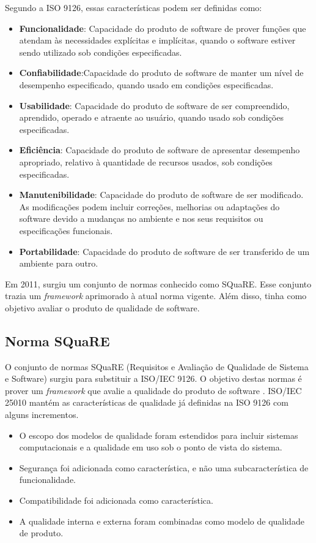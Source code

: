 Segundo a ISO 9126, essas características podem ser definidas como:
\begin{itemize}
\item \textbf{Funcionalidade}: Capacidade do produto de software de prover funções que atendam às necessidades explícitas e implícitas, quando o software estiver sendo utilizado sob condições especificadas.
\item \textbf{Confiabilidade}:Capacidade do produto de software de manter um nível de desempenho especificado, quando usado em condições especificadas.
\item \textbf{Usabilidade}: Capacidade do produto de software de ser compreendido, aprendido, operado e atraente ao usuário, quando usado sob condições especificadas.
\item \textbf{Eficiência}: Capacidade do produto de software de apresentar desempenho apropriado, relativo à quantidade de recursos usados, sob condições especificadas.
\item \textbf{Manutenibilidade}: Capacidade do produto de software de ser modificado. As modificações podem incluir correções, melhorias ou adaptações do software devido a mudanças no ambiente e nos seus requisitos ou especificações funcionais.
\item \textbf{Portabilidade}: Capacidade do produto de software de ser transferido de um ambiente para outro.
\end{itemize}

Em 2011, surgiu um conjunto de normas conhecido como SQuaRE. Esse conjunto trazia um \textit{framework} aprimorado à atual norma vigente. Além disso, tinha como objetivo avaliar o produto de qualidade de software.

\subsection{Norma SQuaRE}
O conjunto de normas SQuaRE (Requisitos e Avaliação de Qualidade de Sistema e Software) surgiu para substituir a ISO/IEC 9126. O objetivo destas normas é prover um \textit{framework} que avalie a qualidade do produto de software \cite{luiza_yago}. ISO/IEC 25010 mantém as características de qualidade já definidas na ISO 9126 com alguns incrementos.

\begin{itemize}
\item O escopo dos modelos de qualidade foram estendidos para incluir sistemas computacionais e a qualidade em uso sob o ponto de vista do sistema.
\item Segurança foi adicionada como característica, e não uma subcaracterística de funcionalidade.
\item Compatibilidade foi adicionada como característica.
\item A qualidade interna e externa foram combinadas como modelo de qualidade de produto.
\end{itemize}

